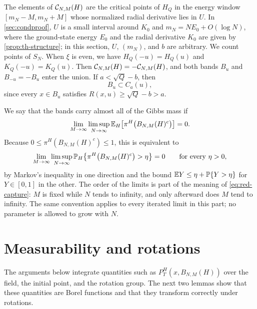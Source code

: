 The elements of $\mathcal C_{N,M}(H)$ are the critical points of $H_Q$ in the energy window $[m_N-M,m_N+M]$ whose normalized radial derivative lies in $U$. In \cref{sec:condproof}, $U$ is a small interval around $K_0$ and $m_N=NE_0+O(\log N)$, where the ground-state energy $E_0$ and the radial derivative $K_0$ are given by \cref{prop:th-structure}; in this section, $U$, $(m_N)$, and $b$ are arbitrary. We count points of $S_N$. When $\xi$ is even, we have $H_Q(-u)=H_Q(u)$ and $K_Q(-u)=K_Q(u)$. Then $\mathcal C_{N,M}(H)=-\mathcal C_{N,M}(H)$, and both bands $B_u$ and $B_{-u}=-B_u$ enter the union. If $a<\sqrt Q-b$, then
\begin{equation*}
B_u\subset C_a(u),
\end{equation*}
since every $x\in B_u$ satisfies $R(x,u)\ge\sqrt Q-b>a$.

We say that the bands carry almost all of the Gibbs mass if
\begin{equation}\label{eq:red-capture}
\lim_{M\to\infty}\limsup_{N\to\infty}\mathbb E_H\bigl[\pi^{H}\bigl(B_{N,M}(H)^c\bigr)\bigr]=0.
\end{equation}
Because $0\le\pi^H(B_{N,M}(H)^c)\le1$, this is equivalent to
\begin{equation*}
\lim_{M\to\infty}\limsup_{N\to\infty}\mathbb P_H\bigl\{\pi^H\bigl(B_{N,M}(H)^c\bigr)>\eta\bigr\}=0\qquad\text{for every }\eta>0,
\end{equation*}
by Markov's inequality in one direction and the bound $\mathbb E Y\le\eta+\mathbb P\{Y>\eta\}$ for $Y\in[0,1]$ in the other. The order of the limits is part of the meaning of \eqref{eq:red-capture}: $M$ is fixed while $N$ tends to infinity, and only afterward does $M$ tend to infinity. The same convention applies to every iterated limit in this part; no parameter is allowed to grow with $N$.

\section{Measurability and rotations}\label{sec:red-measurability}

The arguments below integrate quantities such as $P^H_T(x,B_{N,M}(H))$ over the field, the initial point, and the rotation group. The next two lemmas show that these quantities are Borel functions and that they transform correctly under rotations.

